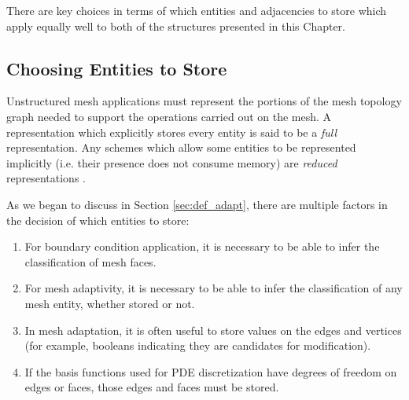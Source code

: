 There are key choices in terms of which entities
and adjacencies to store which apply equally well
to both of the structures presented in this Chapter.

\subsection{Choosing Entities to Store}

Unstructured mesh applications must represent
the portions of the mesh topology graph
needed to support the operations carried out on the mesh.
A representation which explicitly stores
every entity is said to be a {\it full}
representation.
Any schemes which allow some entities to be represented
implicitly (i.e. their presence does not consume memory)
are {\it reduced} representations
\cite{seol2005fmdb,garimella2002mesh,remacle2003algorithm}.

As we began to discuss in Section \ref{sec:def_adapt},
there are multiple factors in the decision of which entities to store:
\begin{enumerate}
\item For boundary condition application, it is necessary to
be able to infer the classification of mesh faces.
\item For mesh adaptivity, it is necessary to be able to
infer the classification of any mesh entity, whether stored or not.
\item In mesh adaptation, it is often useful to store values
on the edges and vertices (for example, booleans indicating they
are candidates for modification).
\item If the basis functions used for PDE discretization have
degrees of freedom on edges or faces, those edges and faces
must be stored.
\end{enumerate}

